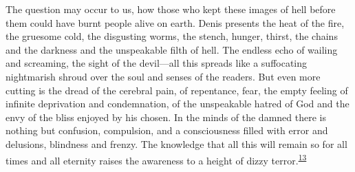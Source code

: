 The question may occur to us, how those who kept these images of hell
before them could have burnt people alive on earth. Denis presents the
heat of the fire, the gruesome cold, the disgusting worms, the stench,
hunger, thirst, the chains and the darkness and the unspeakable filth of
hell. The endless echo of wailing and screaming, the sight of the
devil---all this spreads like a suffocating nightmarish shroud over the
soul and senses of the readers. But even more cutting is the dread of
the cerebral pain, of repentance, fear, the empty feeling of infinite
deprivation and condemnation, of the unspeakable hatred of God and the
envy of the bliss enjoyed by his chosen. In the minds of the damned
there is nothing but confusion, compulsion, and a consciousness filled
with error and delusions, blindness and frenzy. The knowledge that all
this will remain so for all times and all eternity raises the awareness
to a height of dizzy
terror.\textsuperscript{\protect\hypertarget{17_Chapter_Ten__THE_FAILURE_OF_IMAG.xhtmlux5cux23id_710}{\protect\hyperlink{23_NOTES.xhtmlux5cux23id_711}{13}}}

